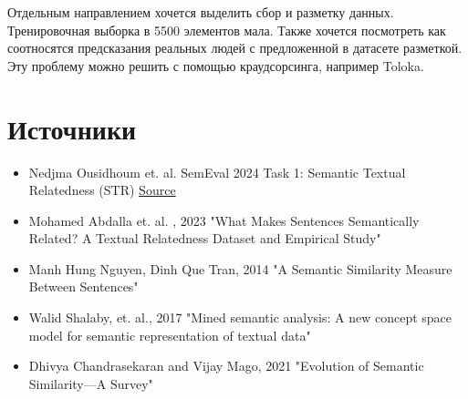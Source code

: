 \documentclass[12pt]{article}
\begin{document}
Отдельным направлением хочется выделить сбор и разметку данных. Тренировочная выборка в 5500 элементов мала. Также хочется посмотреть как соотносятся предсказания реальных людей с предложенной в датасете разметкой. Эту проблему можно решить с помощью краудсорсинга, например Toloka.
\newpage


\section{Источники}
\begin{itemize}
    \item Nedjma Ousidhoum et. al. SemEval 2024 Task 1: Semantic Textual Relatedness (STR)
   \href{https://semantic-textual-relatedness.github.io/}{Source}

    \item Mohamed Abdalla et. al. , 2023 "What Makes Sentences Semantically Related?
    A Textual Relatedness Dataset and Empirical Study"

    \item Manh Hung Nguyen, Dinh Que Tran, 2014 "A Semantic Similarity Measure Between Sentences"

    \item Walid Shalaby, et. al., 2017 "Mined semantic analysis: A new concept space model for semantic representation of textual data"

    \item Dhivya Chandrasekaran and Vijay Mago, 2021 "Evolution of Semantic Similarity—A Survey"
\end{itemize}
\end{document}
